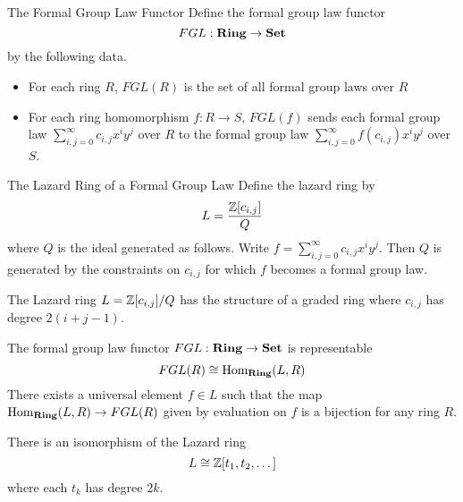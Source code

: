 \documentclass[a4paper]{article}
\begin{document}
\begin{defn}{The Formal Group Law Functor}{} Define the formal group law functor $$FGL:\bold{Ring}\to\bold{Set}$$ by the following data. 
\begin{itemize}
\item For each ring $R$, $FGL(R)$ is the set of all formal group laws over $R$
\item For each ring homomorphism $f:R\to S$, $FGL(f)$ sends each formal group law $\sum_{i,j=0}^\infty c_{i,j}x^iy^j$ over $R$ to the formal group law $\sum_{i,j=0}^\infty f(c_{i,j})x^iy^j$ over $S$. 
\end{itemize}
\end{defn}

\begin{defn}{The Lazard Ring of a Formal Group Law}{} Define the lazard ring by $$L=\frac{\mathbb{Z}[c_{i,j}]}{Q}$$ where $Q$ is the ideal generated as follows. Write $f=\sum_{i,j=0}^\infty c_{i,j}x^iy^j$. Then $Q$ is generated by the constraints on $c_{i,j}$ for which $f$ becomes a formal group law. 
\end{defn}

\begin{lmm}{}{} The Lazard ring $L=\mathbb{Z}[c_{i,j}]/Q$ has the structure of a graded ring where $c_{i,j}$ has degree $2(i+j-1)$. 
\end{lmm}

\begin{thm}{}{} The formal group law functor $FGL:\bold{Ring}\to\bold{Set}$ is representable $$FGL(R)\cong\operatorname{Hom}_\bold{Ring}(L,R)$$ There exists a universal element $f\in L$ such that the map $\operatorname{Hom}_\bold{Ring}(L,R)\to FGL(R)$ given by evaluation on $f$ is a bijection for any ring $R$. 
\end{thm}

\begin{thm}{}{} There is an isomorphism of the Lazard ring $$L\cong\mathbb{Z}[t_1,t_2,\dots]$$ where each $t_k$ has degree $2k$. 
\end{thm}
\end{document}
